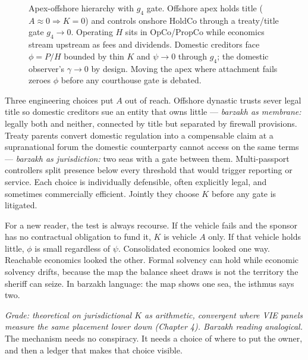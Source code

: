\begin{figure}[h]
\caption{Apex-offshore hierarchy with $g_4$ gate. Offshore apex holds title ($A\approx0\Rightarrow K=0$) and controls onshore HoldCo through a treaty/title gate $g_4\to0$. Operating $H$ sits in OpCo/PropCo while economics stream upstream as fees and dividends. Domestic creditors face $\phi=P/H$ bounded by thin $K$ and $\psi\to0$ through $g_4$; the domestic observer's $\gamma\to0$ by design. Moving the apex where attachment fails zeroes $\phi$ before any courthouse gate is debated.}
\label{fig:hierarchy-ch7}
\end{figure}

Three engineering choices put $A$ out of reach. Offshore dynastic trusts sever legal title so domestic creditors sue an entity that owns little --- \textit{barzakh as membrane:} legally both and neither, connected by title but separated by firewall provisions. Treaty parents convert domestic regulation into a compensable claim at a supranational forum the domestic counterparty cannot access on the same terms --- \textit{barzakh as jurisdiction:} two seas with a gate between them. Multi-passport controllers split presence below every threshold that would trigger reporting or service. Each choice is individually defensible, often explicitly legal, and sometimes commercially efficient. Jointly they choose $K$ before any gate is litigated.

For a new reader, the test is always recourse. If the vehicle fails and the sponsor has no contractual obligation to fund it, $K$ is vehicle $A$ only. If that vehicle holds little, $\phi$ is small regardless of $\psi$. Consolidated economics looked one way. Reachable economics looked the other. Formal solvency can hold while economic solvency drifts, because the map the balance sheet draws is not the territory the sheriff can seize. In barzakh language: the map shows one sea, the isthmus says two.

\textit{Grade: theoretical on jurisdictional $K$ as arithmetic, convergent where VIE panels measure the same placement lower down (Chapter 4). Barzakh reading analogical.} The mechanism needs no conspiracy. It needs a choice of where to put the owner, and then a ledger that makes that choice visible.

